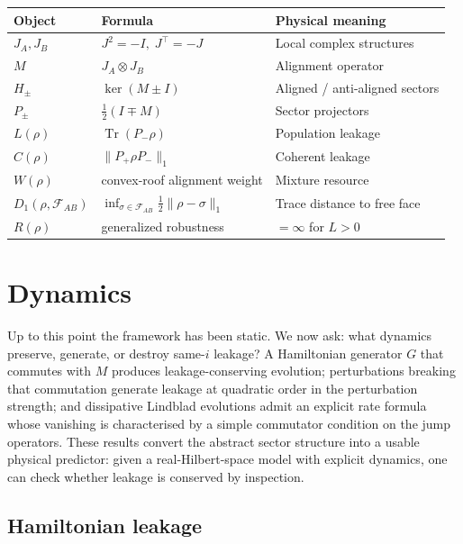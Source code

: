 \documentclass[a4paper,onecolumn,noarxiv]{quantumarticle}
\theoremstyle{plain}
\theoremstyle{definition}
\theoremstyle{remark}
\newcommand{\Pplus}{P_{+}}
\newcommand{\Pminus}{P_{-}}
\newcommand{\Mop}{M}
\newcommand{\FAB}{\mathcal{F}_{AB}}
\newcommand{\Tr}{\operatorname{Tr}}
\newcommand{\Lleak}{L}
\begin{document}
\begin{center}
\renewcommand{\arraystretch}{1.15}
\begin{tabular}{@{}lll@{}}
\toprule
Object & Formula & Physical meaning \\
\midrule
$J_A,J_B$ & $J^2=-I,\;J^\top=-J$ & Local complex structures \\
$\Mop$ & $J_A\otimes J_B$ & Alignment operator \\
$H_\pm$ & $\ker(\Mop\pm I)$ & Aligned / anti-aligned sectors \\
$P_\pm$ & $\tfrac{1}{2}(I\mp\Mop)$ & Sector projectors \\
$\Lleak(\rho)$ & $\Tr(\Pminus\rho)$ & Population leakage \\
$C(\rho)$ & $\|\Pplus\rho\Pminus\|_1$ & Coherent leakage \\
$W(\rho)$ & convex-roof alignment weight & Mixture resource \\
$D_1(\rho,\FAB)$ & $\inf_{\sigma\in\FAB}\tfrac{1}{2}\|\rho-\sigma\|_1$
  & Trace distance to free face \\
$R(\rho)$ & generalized robustness & $=\infty$ for $\Lleak>0$ \\
\bottomrule
\end{tabular}
\end{center}

\section{Dynamics}
\label{sec:dynamics}

Up to this point the framework has been static. We now ask: what dynamics preserve,
generate, or destroy same-$i$ leakage? A Hamiltonian generator $G$ that commutes
with $\Mop$ produces leakage-conserving evolution; perturbations breaking that
commutation generate leakage at quadratic order in the perturbation strength; and
dissipative Lindblad evolutions admit an explicit rate formula whose vanishing is
characterised by a simple commutator condition on the jump operators. These results
convert the abstract sector structure into a usable physical predictor: given a
real-Hilbert-space model with explicit dynamics, one can check whether leakage is
conserved by inspection.

\subsection{Hamiltonian leakage}
\end{document}
